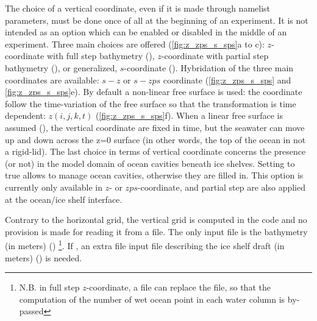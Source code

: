 \documentclass[../tex_main/NEMO_manual]{subfiles}
\begin{document}
The choice of a vertical coordinate, even if it is made through  namelist parameters, 
must be done once of all at the beginning of an experiment.
It is not intended as an option which can be enabled or disabled in the middle of an experiment.
Three main choices are offered (\autoref{fig:z_zps_s_sps}a to c):
$z$-coordinate with full step bathymetry (),
$z$-coordinate with partial step bathymetry (),
or generalized, $s$-coordinate ().
Hybridation of the three main coordinates are available:
$s-z$ or $s-zps$ coordinate (\autoref{fig:z_zps_s_sps} and \autoref{fig:z_zps_s_sps}e).
By default a non-linear free surface is used: the coordinate follow the time-variation of the free surface so that
the transformation is time dependent: $z(i,j,k,t)$ (\autoref{fig:z_zps_s_sps}f).
When a linear free surface is assumed (),
the vertical coordinate are fixed in time, but the seawater can move up and down across the z=0 surface
(in other words, the top of the ocean in not a rigid-lid). 
The last choice in terms of vertical coordinate concerns the presence (or not) in
the model domain of ocean cavities beneath ice shelves.
Setting  to true allows to manage ocean cavities, otherwise they are filled in.
This option is currently only available in $z$- or $zps$-coordinate,
and partial step are also applied at the ocean/ice shelf interface.

Contrary to the horizontal grid, the vertical grid is computed in the code and
no provision is made for reading it from a file.
The only input file is the bathymetry (in meters) ()
\footnote{
  N.B. in full step $z$-coordinate, a  file can replace the  file,
  so that the computation of the number of wet ocean point in each water column is by-passed}. 
If ,
an extra file input file describing the ice shelf draft (in meters) () is needed.
\end{document}
